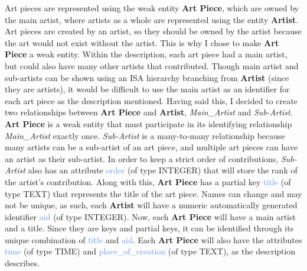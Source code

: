 \documentclass[11pt]{article}
\begin{document}
Art pieces are represented using the weak entity \textbf{Art Piece}, which are owned by the main artist, where artists as a whole are represented using the entity \textbf{Artist}. Art pieces are created by an artist, so they should be owned by the artist because the art would not exist without the artist. This is why I chose to make \textbf{Art Piece} a weak entity. Within the description, each art piece had a main artist, but could also have many other artists that contributed. Though main artist and sub-artists can be shown using an ISA hierarchy branching from \textbf{Artist} (since they are artists), it would be difficult to use the main artist as an identifier for each art piece as the description mentioned. Having said this, I decided to create two relationships between \textbf{Art Piece} and \textbf{Artist}, \textit{Main\_Artist} and \textit{Sub-Artist}. \textbf{Art Piece} is a weak entity that must participate in its identifying relationship \textit{Main\_Artist} exactly once. \textit{Sub-Artist} is a many-to-many relationship because many artists can be a sub-artist of an art piece, and multiple art pieces can have an artist as their sub-artist. In order to keep a strict order of contributions, \textit{Sub-Artist} also has an attribute \textcolor{CornflowerBlue}{order} (of type INTEGER) that will store the rank of the artist's contribution. Along with this, \textbf{Art Piece} has a partial key \textcolor{CornflowerBlue}{title} (of type TEXT) that represents the title of the art piece. Names can change and may not be unique, as such, each \textbf{Artist} will have a numeric automatically generated identifier \textcolor{CornflowerBlue}{aid} (of type INTEGER). Now, each \textbf{Art Piece} will have a main artist and a title. Since they are keys and partial keys, it can be identified through its unique combination of \textcolor{CornflowerBlue}{title} and \textcolor{CornflowerBlue}{aid}. Each \textbf{Art Piece} will also have the attributes \textcolor{CornflowerBlue}{time} (of type TIME) and \textcolor{CornflowerBlue}{place\_of\_creation} (of type TEXT), as the description describes. \\
\end{document}
